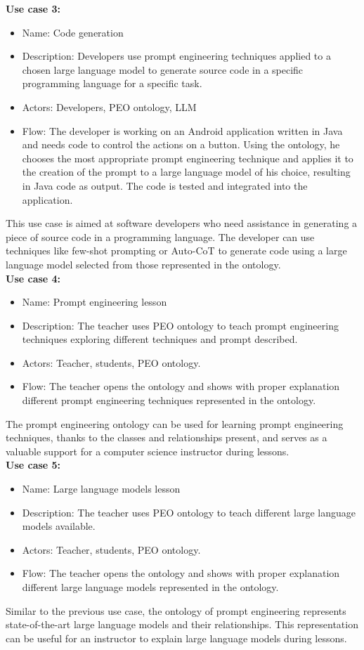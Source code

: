 \textbf{Use case 3:}
\begin{itemize}
    \item Name: Code generation
    \item Description: Developers use prompt engineering techniques applied to a chosen large language model to generate source code in a specific programming language for a specific task.
    \item Actors: Developers, PEO ontology, LLM
    \item Flow: The developer is working on an Android application written in Java and needs code to control the actions on a button. Using the ontology, he chooses the most appropriate prompt engineering technique and applies it to the creation of the prompt to a large language model of his choice,  resulting in Java code as output. The code is tested and integrated into the application. 
\end{itemize}
This use case is aimed at software developers who need assistance in generating a piece of source code in a programming language. The developer can use techniques like few-shot prompting or Auto-CoT to generate code using a large language model selected from those represented in the ontology. \\ 

\textbf{Use case 4:}
\begin{itemize}
    \item Name: Prompt engineering lesson
    \item Description: The teacher uses PEO ontology to teach prompt engineering techniques exploring different techniques and prompt described. 
    \item Actors: Teacher, students, PEO ontology. 
    \item Flow: The teacher opens the ontology and shows with proper explanation different prompt engineering techniques represented in the ontology.
\end{itemize}
The prompt engineering ontology can be used for learning prompt engineering techniques, thanks to the classes and relationships present, and serves as a valuable support for a computer science instructor during lessons.\\

\textbf{Use case 5:}
\begin{itemize}
    \item Name: Large language models lesson
    \item Description: The teacher uses PEO ontology to teach different large language models available.
    \item Actors: Teacher, students, PEO ontology.
    \item Flow: The teacher opens the ontology and shows with proper explanation different large language models represented in the ontology. 
\end{itemize}
Similar to the previous use case, the ontology of prompt engineering represents state-of-the-art large language models and their relationships. This representation can be useful for an instructor to explain large language models during lessons. \\

